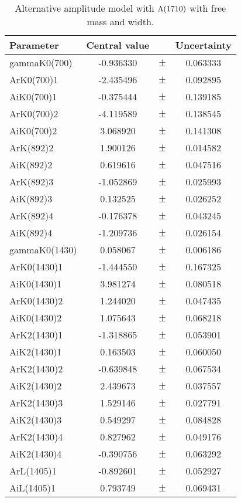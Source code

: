 \clearpage

\begin{table}
\centering
\caption{Alternative amplitude model with ${\Lambda}(1710)$ with free mass and width.}
\begin{tiny}
\begin{tabular}{lccc}
\toprule
Parameter & Central value & & Uncertainty\\
\midrule 
gammaK0(700) & -0.936330 & $\pm$ & 0.063333 \\
ArK0(700)1 & -2.435496 & $\pm$ & 0.092895 \\
AiK0(700)1 & -0.375444 & $\pm$ & 0.139185 \\
ArK0(700)2 & -4.119589 & $\pm$ & 0.138545 \\
AiK0(700)2 & 3.068920 & $\pm$ & 0.141308 \\
ArK(892)2 & 1.900126 & $\pm$ & 0.014582 \\
AiK(892)2 & 0.619616 & $\pm$ & 0.047516 \\
ArK(892)3 & -1.052869 & $\pm$ & 0.025993 \\
AiK(892)3 & 0.132525 & $\pm$ & 0.026252 \\
ArK(892)4 & -0.176378 & $\pm$ & 0.043245 \\
AiK(892)4 & -1.209736 & $\pm$ & 0.026154 \\
gammaK0(1430) & 0.058067 & $\pm$ & 0.006186 \\
ArK0(1430)1 & -1.444550 & $\pm$ & 0.167325 \\
AiK0(1430)1 & 3.981274 & $\pm$ & 0.080518 \\
ArK0(1430)2 & 1.244020 & $\pm$ & 0.047435 \\
AiK0(1430)2 & 1.075643 & $\pm$ & 0.068218 \\
ArK2(1430)1 & -1.318865 & $\pm$ & 0.053901 \\
AiK2(1430)1 & 0.163503 & $\pm$ & 0.060050 \\
ArK2(1430)2 & -0.639848 & $\pm$ & 0.067534 \\
AiK2(1430)2 & 2.439673 & $\pm$ & 0.037557 \\
ArK2(1430)3 & 1.529146 & $\pm$ & 0.027791 \\
AiK2(1430)3 & 0.549297 & $\pm$ & 0.084828 \\
ArK2(1430)4 & 0.827962 & $\pm$ & 0.049176 \\
AiK2(1430)4 & -0.390756 & $\pm$ & 0.063292 \\
ArL(1405)1 & -0.892601 & $\pm$ & 0.052927 \\
AiL(1405)1 & 0.793749 & $\pm$ & 0.069431 \\

\end{tabular}
\end{tiny}
\end{table}
